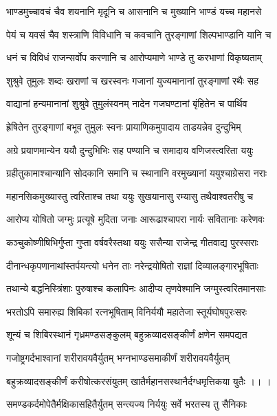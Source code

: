 \twolineshloka
{भाण्डमुच्चावचं चैव शयनानि मृदूनि च}
{आसनानि च मुख्यानि भाण्डं यच्च महानसे}%

\twolineshloka
{पेयं च यवसं चैव शस्त्राणि विविधानि च}
{कवचानि तुरङ्गाणां शिल्पभाण्डानि यानि च}%

\twolineshloka
{धनं च विविधं राजन्सर्वोप करणानि च}
{आरोप्यमाणे भाण्डे तु करभाणां विकृष्यताम्}%

\twolineshloka
{शुश्रुवे तुमुलः शब्दः खराणां च खरस्वनः}
{गजानां युज्यमानानां तुरङ्गाणां रथैः सह}%

\twolineshloka
{वाद्यानां हन्यमानानां शुश्रुवे तुमुलंस्वनम्}
{नादेन गजघण्टानां बृंहितेन च पार्थिव} %

\twolineshloka
{ह्रेषितेन तुरङ्गाणां बभूव तुमुलः स्वनः}
{प्रायाणिकमुपादाय ताडयन्नेव दुन्दुभिम्}%

\twolineshloka
{अग्रे प्रयाणमान्येन ययौ दुन्दुभिभिः सह}
{पण्यानि च समादाय वणिजस्त्वरिता ययुः}%

\twolineshloka
{ग्रहीतुकामाश्चान्यानि सोदकानि समानि च}
{स्थानानि वरमुख्यानां ययुश्चाग्रेसरा नराः}%

\twolineshloka
{महानसिकमुख्यास्तु त्वरिताश्च तथा ययुः}
{सुखयानासु रम्यासु तथैवाश्वतरीषु च}%

\twolineshloka
{आरोप्य योषितो जग्मुः प्रत्यूषे मुदिता जनाः}
{आरूढाश्चापरा नार्यः सवितानाः करेणवः}%

\twolineshloka
{कञ्चुकोष्णीषिभिर्गुप्ता गुप्ता वर्षवरैस्तथा}
{ययुः ससैन्या राजेन्द्र गीतवाद्य पुरस्सराः}%

\twolineshloka
{दीनान्धकृपणानाथांस्तर्पयन्त्यो धनेन ताः}
{नरेन्द्रयोषितो राज्ञां दिव्यालङ्गारभूषिताः}%

\twolineshloka
{तथान्ये बद्धनिस्त्रिंशाः पुरुषाश्च कलापिनः}
{आदीप्य तृणवेश्मानि जग्मुस्त्वरितमानसाः}%

\twolineshloka
{भरतोऽपि समारुह्य शिबिकां रत्नभूषिताम्}
{विनिर्ययौ महातेजा स्तूर्यघोषपुरःसरः}%

\twolineshloka
{शून्यं च शिबिरस्थानं गृध्रमण्डसङ्कुलम्}
{बहुक्रव्यादसङ्कीर्णं क्षणेन समपद्यत} %

\twolineshloka
{गजोष्ट्रगर्दभाश्वानां शरीरावयवैर्युतम्}
{भग्नभाण्डसमाकीर्णं शरीरावयवैर्युतम्}%

\twolineshloka
{बहुक्रव्यादसङ्कीर्णं करीषोत्करसंयुतम्}
{खातैर्महानसस्थानैर्दग्धमृत्तिकया युतैः ।। ।}%

\twolineshloka
{समण्डकर्दमोपेतैर्मक्षिकासहितैर्युतम्}
{सन्त्यज्य निर्ययुः सर्वे भरतस्य तु सैनिकाः}%

